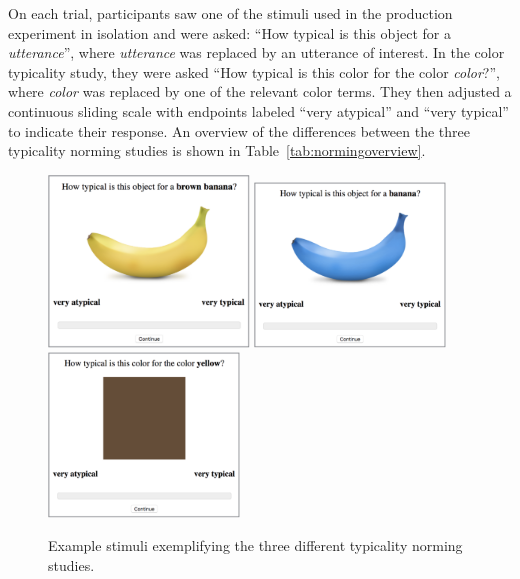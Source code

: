 \documentclass[11pt]{article}
\begin{document}
On each trial, participants saw one of the stimuli used in the production experiment in isolation and were asked: ``How typical is this object for a \emph{utterance}'', where \emph{utterance} was replaced by an utterance of interest. In the color typicality study, they were asked ``How typical is this color for the color \emph{color}?'', where \emph{color} was replaced by one of the relevant color terms. They then adjusted a continuous sliding scale with endpoints labeled ``very atypical'' and ``very typical'' to indicate their response. An overview of the differences between the three typicality norming studies is shown in Table~\ref{tab:normingoverview}. 

\begin{figure}[bt!]
	 {\includegraphics[width=2.1in]{pics/typnorm_colorobj}} \hfill
	{\includegraphics[width=2in]{pics/typnorm_obj}} \hfill
	 {\includegraphics[width=2in]{pics/typnorm_colorpatch}}%
	\caption{Example stimuli exemplifying the three different typicality norming studies.}
	\label{fig:typ_norm}
\end{figure}
\end{document}

